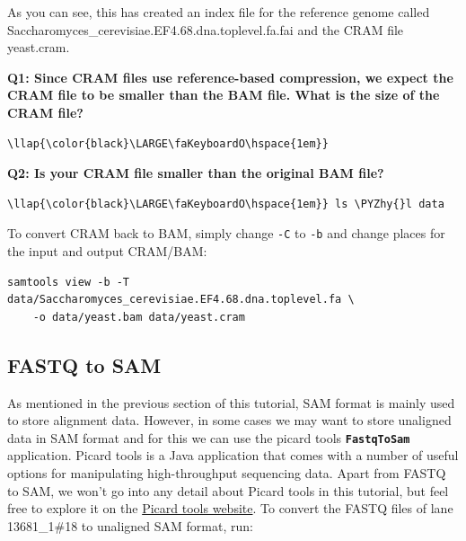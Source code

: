 \documentclass[11pt]{article}
\def\PYZhy{\char`\-}
\begin{document}
    As you can see, this has created an index file for the reference genome
called Saccharomyces\_cerevisiae.EF4.68.dna.toplevel.fa.fai and the CRAM
file yeast.cram.

    \textbf{Q1: Since CRAM files use reference-based compression, we expect
the CRAM file to be smaller than the BAM file. What is the size of the
CRAM file?}

\begin{terminalinput}
\begin{Verbatim}[commandchars=\\\{\}]
\llap{\color{black}\LARGE\faKeyboardO\hspace{1em}}
\end{Verbatim}
\end{terminalinput}

    \textbf{Q2: Is your CRAM file smaller than the original BAM file?}

\begin{terminalinput}
\begin{Verbatim}[commandchars=\\\{\}]
\llap{\color{black}\LARGE\faKeyboardO\hspace{1em}} ls \PYZhy{}l data
\end{Verbatim}
\end{terminalinput}

    To convert CRAM back to BAM, simply change \texttt{-C} to \texttt{-b}
and change places for the input and output CRAM/BAM:

\begin{verbatim}
samtools view -b -T data/Saccharomyces_cerevisiae.EF4.68.dna.toplevel.fa \
    -o data/yeast.bam data/yeast.cram
\end{verbatim}

    \hypertarget{fastq-to-sam}{%
\subsection{FASTQ to SAM}\label{fastq-to-sam}}

As mentioned in the previous section of this tutorial, SAM format is
mainly used to store alignment data. However, in some cases we may want
to store unaligned data in SAM format and for this we can use the picard
tools \textbf{\texttt{FastqToSam}} application. Picard tools is a Java
application that comes with a number of useful options for manipulating
high-throughput sequencing data. Apart from FASTQ to SAM, we won't go
into any detail about Picard tools in this tutorial, but feel free to
explore it on the \href{https://broadinstitute.github.io/picard/}{Picard
tools website}. To convert the FASTQ files of lane 13681\_1\#18 to
unaligned SAM format, run:
\end{document}
